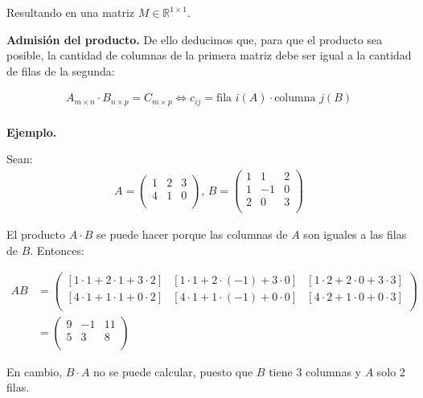 \documentclass[12pt]{article}
\begin{document}
Resultando en una matriz \(M \in \mathbb{R}^{1 \times 1}\).

\textbf{Admisión del producto.}
De ello deducimos que,
para que el producto sea posible,
la cantidad de columnas de la primera matriz debe ser igual a la cantidad
de filas de la segunda:

\begin{align*}
  A_{m \times n} \cdot B_{n \times p} = C_{m \times p} \iff c_{ij} = \text{fila }i(A) \cdot \text{columna }j(B) \\
\end{align*}

\textbf{Ejemplo.}

Sean:
\begin{align*}
  A = \begin{pmatrix}
        1 & 2 & 3 \\
        4 & 1 & 0 \\
      \end{pmatrix}
  \text{, }
  B = \begin{pmatrix}
        1 & 1  & 2 \\
        1 & -1 & 0 \\
        2 & 0  & 3 \\
      \end{pmatrix}
\end{align*}

El producto \(A \cdot B\) se puede hacer porque las columnas de \(A\) son
iguales a las filas de \(B\). Entonces:

\begin{align*}
  AB & = \begin{pmatrix}
           [1 \cdot 1 + 2 \cdot 1 + 3 \cdot 2] & [1 \cdot 1 + 2 \cdot (-1) + 3 \cdot 0] & [1 \cdot 2 + 2 \cdot 0 + 3 \cdot 3] \\
           [4 \cdot 1 + 1 \cdot 1 + 0 \cdot 2] & [4 \cdot 1 + 1 \cdot (-1) + 0 \cdot 0] & [4 \cdot 2 + 1 \cdot 0 + 0 \cdot 3] \\
         \end{pmatrix} \\
     & =
  \begin{pmatrix}
    9 & -1 & 11 \\
    5 & 3  & 8  \\
  \end{pmatrix}
\end{align*}

En cambio, \(B \cdot A\) no se puede calcular,
puesto que \(B\) tiene 3 columnas y \(A\) solo 2 filas.
\end{document}

